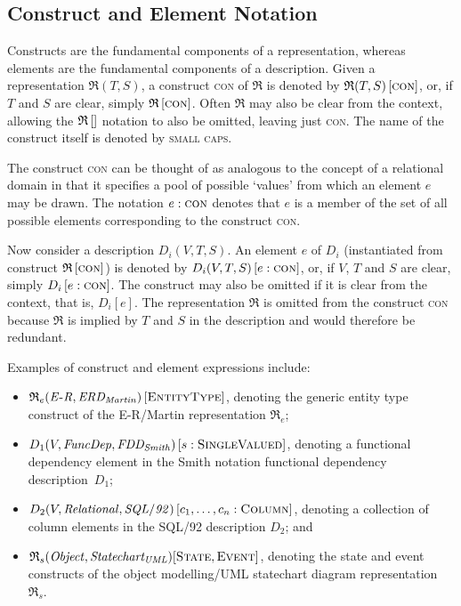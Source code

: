 \documentclass[10pt]{llncs}
\newcommand{\ER}{\mathit{E\textrm{-}R}}
\newcommand{\Martin}{\mathit{ERD_{Martin}}}
\newcommand{\FD}{\mathit{FuncDep}}
\newcommand{\Smith}{\mathit{FDD_{Smith}}}
\newcommand{\RM}{\mathit{Relational}}
\newcommand{\SQL}{\mathit{SQL/92}}
\newcommand{\Representation}[3]{\ensuremath{\mathfrak{#1}(#2,#3)}}
\newcommand{\RepresentationS}[4]{\ensuremath{\mathfrak{#1}_{#2}(#3,#4)}}
\newcommand{\Rep}[1]{\ensuremath{\mathfrak{#1}}}
\newcommand{\RepS}[2]{\ensuremath{\mathfrak{#1}_{#2}}}
\newcommand{\Description}[4]{\ensuremath{#1(#2,#3,#4)}}
\newcommand{\domain}[1]{\textsc{#1}}
\newcommand{\Element}[2]{\ensuremath{ #1 \left[ #2 \right] }}
\newcommand{\Elementt}[3]{\ensuremath{ #1 \left[ #2 : \domain{#3} \right] }}
\newcommand{\construct}[2]{\ensuremath{ #1 \left[ \domain{#2} \right] }}
\newcommand{\Construct}[2]{\ensuremath{ \mathfrak{#1} \left[ \domain{#2} \right] }}
\begin{document}

\subsection{Construct and Element Notation}

Constructs are the fundamental components of a representation, whereas elements are the fundamental components of a description. Given a representation \Representation{R}{T}{S}, a construct \domain{con} of \Rep{R} is denoted by \construct{\Representation{R}{T}{S}}{con}, or, if $T$ and $S$ are clear, simply \Construct{R}{con}. Often \Rep{R} may also be clear from the context, allowing the \Construct{R}{} notation to also be omitted, leaving just \domain{con}. The name of the construct itself is denoted by \textsc{small caps}.

The construct \domain{con} can be thought of as analogous to the concept of a relational domain in that it specifies a pool of possible `values' from which an element $e$ may be drawn. The notation $e:\domain{con}$ denotes that $e$ is a member of the set of all possible elements corresponding to the construct \domain{con}.

Now consider a description \Description{D_{i}}{V}{T}{S}. An element $e$ of $D_{i}$ (instantiated from construct \Construct{R}{con}) is denoted by \Elementt{\Description{D_{i}}{V}{T}{S}}{e}{con}, or, if $V$, $T$ and $S$ are clear, simply \Elementt{D_{i}}{e}{con}. The construct may also be omitted if it is clear from the context, that is, \Element{D_{i}}{e}. The representation \Rep{R} is omitted from the construct \domain{con} because \Rep{R} is implied by $T$ and $S$ in the description and would therefore be redundant.

Examples of construct and element expressions include:
\begin{itemize}
	\item \construct{\RepresentationS{R}{e}{\ER}{\Martin}}{EntityType}, denoting the generic entity type construct of the E-R/Martin representation \RepS{R}{e};
	\item \Elementt{\Description{D_{1}}{V}{\FD}{\Smith}}{s}{SingleValued}, denoting a functional dependency element in the Smith notation functional dependency description~$D_{1}$;
	\item \Elementt{\Description{D_{2}}{V}{\RM}{\SQL}}{c_{1}, \ldots, c_{n}}{Column}, denoting a collection of column elements in the SQL/92 description $D_{2}$; and
	\item \(\RepresentationS{R}{s}{\mathit{Object}}{\mathit{Statechart_{UML}}}[\domain{State},\domain{Event}]\), denoting the state and event constructs of the object modelling/UML statechart diagram representa\-tion~\RepS{R}{s}.
\end{itemize}
\end{document}
